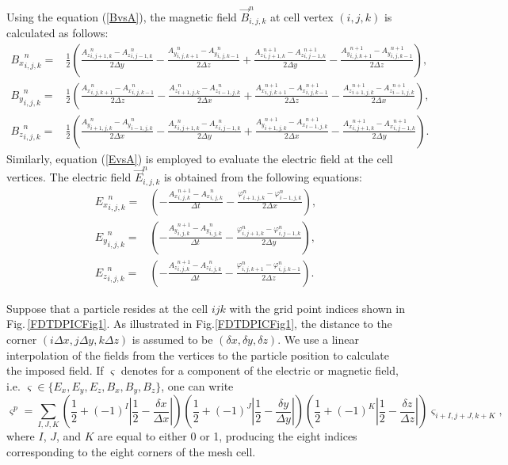 Using the equation (\ref{BvsA}), the magnetic field $\vec{B}^n_{i,j,k}$ at cell vertex $(i,j,k)$ is calculated as follows:
\begin{align}
{B_x}^n_{i,j,k} = & \frac{1}{2} \left( \frac{{A_z}_{i,j+1,k}^n-{A_z}_{i,j-1,k}^n}{2\Delta y} - \frac{{A_y}_{i,j,k+1}^n-{A_y}_{i,j,k-1}^n}{2\Delta z} + \frac{{A_z}_{i,j+1,k}^{n+1}-{A_z}_{i,j-1,k}^{n+1}}{2\Delta y} - \frac{{A_y}_{i,j,k+1}^{n+1}-{A_y}_{i,j,k-1}^{n+1}}{2\Delta z} \right), \\
{B_y}^n_{i,j,k} = & \frac{1}{2} \left( \frac{{A_x}_{i,j,k+1}^n-{A_x}_{i,j,k-1}^n}{2\Delta z} - \frac{{A_z}_{i+1,j,k}^n-{A_z}_{i-1,j,k}^n}{2\Delta x} + \frac{{A_x}_{i,j,k+1}^{n+1}-{A_x}_{i,j,k-1}^{n+1}}{2\Delta z} - \frac{{A_z}_{i+1,j,k}^{n+1}-{A_z}_{i-1,j,k}^{n+1}}{2\Delta x} \right), \\
{B_z}^n_{i,j,k} = & \frac{1}{2} \left( \frac{{A_y}_{i+1,j,k}^n-{A_y}_{i-1,j,k}^n}{2\Delta x} - \frac{{A_x}_{i,j+1,k}^n-{A_x}_{i,j-1,k}^n}{2\Delta y} + \frac{{A_y}_{i+1,j,k}^{n+1}-{A_x}_{i-1,j,k}^{n+1}}{2\Delta x} - \frac{{A_x}_{i,j+1,k}^{n+1}-{A_x}_{i,j-1,k}^{n+1}}{2\Delta y} \right).
\end{align}
%
Similarly, equation (\ref{EvsA}) is employed to evaluate the electric field at the cell vertices.
%
The electric field $\vec{E}^n_{i,j,k}$ is obtained from the following equations:
%
\begin{align}
{E_x}^n_{i,j,k} = & \left( -\frac{{A_x}_{i,j,k}^{n+1}-{A_x}_{i,j,k}^n}{\Delta t} - \frac{\varphi_{i+1,j,k}^n-\varphi_{i-1,j,k}^n}{2\Delta x} \right), \\
{E_y}^n_{i,j,k} = & \left( -\frac{{A_y}_{i,j,k}^{n+1}-{A_y}_{i,j,k}^n}{\Delta t} - \frac{\varphi_{i,j+1,k}^n-\varphi_{i,j-1,k}^n}{2\Delta y} \right), \\
{E_z}^n_{i,j,k} = & \left( -\frac{{A_z}_{i,j,k}^{n+1}-{A_z}_{i,j,k}^n}{\Delta t} - \frac{\varphi_{i,j,k+1}^n-\varphi_{i,j,k-1}^n}{2\Delta z} \right).
\end{align}

Suppose that a particle resides at the cell $ijk$ with the grid point indices shown in Fig.\,\ref{FDTDPICFig1}. %
%
As illustrated in Fig.\ref{FDTDPICFig1}, the distance to the corner $(i\Delta x, j\Delta y, k \Delta z)$ is assumed to be $(\delta x, \delta y, \delta z)$.
%
We use a linear interpolation of the fields from the vertices to the particle position to calculate the imposed field.
%
If $\varsigma$ denotes for a component of the electric or magnetic field, i.e. $\varsigma \in \{ E_x, E_y, E_z, B_x, B_y, B_z \}$, one can write
%
\begin{equation}
\label{fieldInterpolation}
\varsigma^p = \sum\limits_{I,J,K} \left(\frac{1}{2} + (-1)^I \left| \frac{1}{2} - \frac{\delta x}{\Delta x} \right| \right)
\left(\frac{1}{2} + (-1)^J \left| \frac{1}{2} - \frac{\delta y}{\Delta y} \right| \right)
\left(\frac{1}{2} + (-1)^K \left| \frac{1}{2} - \frac{\delta z}{\Delta z} \right| \right) \varsigma_{i+I,j+J,k+K},
\end{equation}
%
where $I$, $J$, and $K$ are equal to either 0 or 1, producing the eight indices corresponding to the eight corners of the mesh cell.

